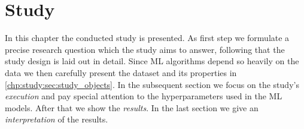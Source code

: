 \chapter{Study}
\label{chp:study}

In this chapter the conducted study is presented.
As first step we formulate a precise research question which the study aims to answer, following that the study design is laid out in detail.
Since \ac{ML} algorithms depend so heavily on the data we then carefully present the dataset and its properties in \cref{chp:study:sec:study_objects}.
In the subsequent section we focus on the study's \textit{execution} and pay special attention to the hyperparameters used in the \ac{ML} models.
After that we show the \textit{results}.
In the last section we give an \textit{interpretation} of the results.







